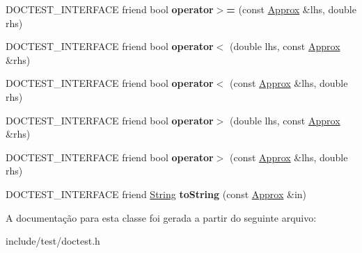 \begin{DoxyCompactItemize}
\item 
\mbox{\label{classdoctest_1_1Approx_a52e1bcec19171f0ec55cc3a280188a03}} 
D\+O\+C\+T\+E\+S\+T\+\_\+\+I\+N\+T\+E\+R\+F\+A\+CE friend bool {\bfseries operator$>$=} (const \hyperlink{classdoctest_1_1Approx}{Approx} \&lhs, double rhs)
\item 
\mbox{\label{classdoctest_1_1Approx_acf32148e34dc6444a3bb4b16e7298279}} 
D\+O\+C\+T\+E\+S\+T\+\_\+\+I\+N\+T\+E\+R\+F\+A\+CE friend bool {\bfseries operator$<$} (double lhs, const \hyperlink{classdoctest_1_1Approx}{Approx} \&rhs)
\item 
\mbox{\label{classdoctest_1_1Approx_a54ce2536ed164b79688f43e373dcbf7b}} 
D\+O\+C\+T\+E\+S\+T\+\_\+\+I\+N\+T\+E\+R\+F\+A\+CE friend bool {\bfseries operator$<$} (const \hyperlink{classdoctest_1_1Approx}{Approx} \&lhs, double rhs)
\item 
\mbox{\label{classdoctest_1_1Approx_a97a6e92b9c9dacc0adb2f76f9faf2924}} 
D\+O\+C\+T\+E\+S\+T\+\_\+\+I\+N\+T\+E\+R\+F\+A\+CE friend bool {\bfseries operator$>$} (double lhs, const \hyperlink{classdoctest_1_1Approx}{Approx} \&rhs)
\item 
\mbox{\label{classdoctest_1_1Approx_a12a93e1726180db4091cb2e3b8ba5e30}} 
D\+O\+C\+T\+E\+S\+T\+\_\+\+I\+N\+T\+E\+R\+F\+A\+CE friend bool {\bfseries operator$>$} (const \hyperlink{classdoctest_1_1Approx}{Approx} \&lhs, double rhs)
\item 
\mbox{\label{classdoctest_1_1Approx_aa1ba324952b7844d35fc569b1c6c139a}} 
D\+O\+C\+T\+E\+S\+T\+\_\+\+I\+N\+T\+E\+R\+F\+A\+CE friend \hyperlink{classdoctest_1_1String}{String} {\bfseries to\+String} (const \hyperlink{classdoctest_1_1Approx}{Approx} \&in)
\end{DoxyCompactItemize}


A documentação para esta classe foi gerada a partir do seguinte arquivo\+:\begin{DoxyCompactItemize}
\item 
include/test/doctest.\+h\end{DoxyCompactItemize}
